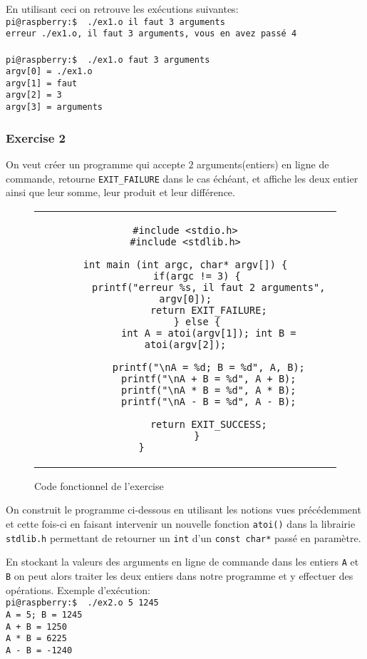 \documentclass[11pt, openright]{book}
\begin{document}
En utilisant ceci on retrouve les exécutions suivantes: \\
\texttt{pi@raspberry:\text{$\sim$}\$ \ ./ex1.o il faut 3 arguments}\\
\texttt{erreur ./ex1.o, il faut 3 arguments, vous en avez passé 4}\\
\\
\texttt{pi@raspberry:\text{$\sim$}\$ \ ./ex1.o faut 3 arguments}\\
\texttt{argv[0] = ./ex1.o}\\
\texttt{argv[1] = faut}\\
\texttt{argv[2] = 3}\\
\texttt{argv[3] = arguments}

\subsubsection{Exercise 2}

On veut créer un programme qui accepte $2$ arguments(entiers) en ligne de commande, retourne \texttt{EXIT\_FAILURE} dans le cas échéant, et affiche les deux entier ainsi que leur somme, leur produit et leur différence.

\begin{figure}[ht!]
	\centering
	\begin{tabular}{c}
		\begin{lstlisting}
#include <stdio.h>
#include <stdlib.h>

int main (int argc, char* argv[]) {
    if(argc != 3) {
        printf("erreur %s, il faut 2 arguments", argv[0]);
        return EXIT_FAILURE;
    } else {
        int A = atoi(argv[1]); int B = atoi(argv[2]);

        printf("\nA = %d; B = %d", A, B);
        printf("\nA + B = %d", A + B);
        printf("\nA * B = %d", A * B);
        printf("\nA - B = %d", A - B);
    
        return EXIT_SUCCESS;
    }
}				\end{lstlisting}
	\end{tabular}
	\caption{Code fonctionnel de l'exercise }
\end{figure}

On construit le programme ci-dessous en utilisant les notions vues précédemment et cette fois-ci en faisant intervenir un nouvelle fonction \texttt{atoi()} dans la librairie \texttt{stdlib.h} permettant de retourner un \texttt{int} d'un \texttt{const char*} passé en paramètre.

En stockant la valeurs des arguments en ligne de commande dans les entiers \texttt{A} et \texttt{B} on peut alors traiter les deux entiers dans notre programme et y effectuer des opérations.
\newpage
Exemple d'exécution:\\
\texttt{pi@raspberry:\text{$\sim$}\$ \ ./ex2.o 5 1245}\\
\texttt{A = 5; B = 1245}\\
\texttt{A + B = 1250}\\
\texttt{A * B = 6225}\\
\texttt{A - B = -1240}
\end{document}
